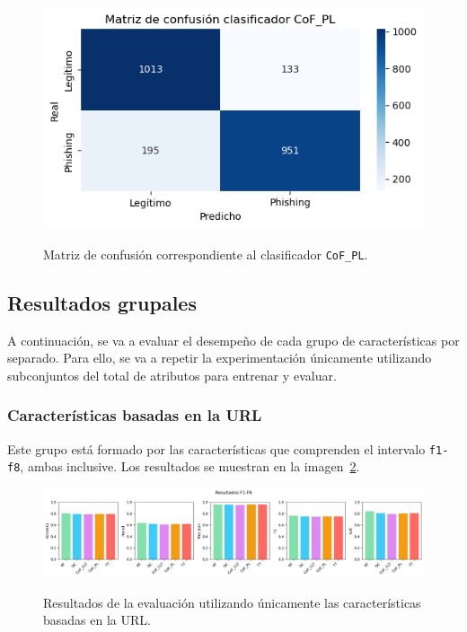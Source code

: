 \begin{figure}[h]
	\caption[\textit{Phishing}: detección (\texttt{f1-f19}, matriz de confusión \texttt{CoF\_PL})]{Matriz de confusión correspondiente al clasificador \texttt{CoF\_PL}.}
	\centering
	\includegraphics[scale=0.8]{../img/memoria/5_phishing/f1f19_cof_clt}
	\label{gr:ph-f1f19_cof_clt}
\end{figure}

\subsection{Resultados grupales}

A continuación, se va a evaluar el desempeño de cada grupo de características por separado. Para ello, se va a repetir la experimentación únicamente utilizando subconjuntos del total de atributos para entrenar y evaluar.

\subsubsection{Características basadas en la URL}

Este grupo está formado por las características que comprenden el intervalo \texttt{f1-f8}, ambas inclusive. Los resultados se muestran en la imagen~\ref{gr:ph-f1f8_small}.

\begin{figure}[h]
	\caption[\textit{Phishing}: detección (\texttt{f1-f8})]{Resultados de la evaluación utilizando únicamente las características basadas en la URL.}
	\centering
	\includegraphics[width=\textwidth]{../img/memoria/5_phishing/f1f8_small}
	\label{gr:ph-f1f8_small}
\end{figure}

